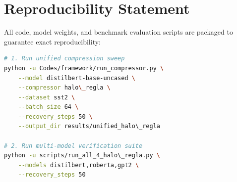 \section{Reproducibility Statement}
All code, model weights, and benchmark evaluation scripts are packaged to guarantee exact reproducibility:
\begin{lstlisting}[language=bash]
# 1. Run unified compression sweep
python -u Codes/framework/run_compressor.py \
    --model distilbert-base-uncased \
    --compressor halo\_regla \
    --dataset sst2 \
    --batch_size 64 \
    --recovery_steps 50 \
    --output_dir results/unified_halo\_regla

# 2. Run multi-model verification suite
python -u scripts/run_all_4_halo\_regla.py \
    --models distilbert,roberta,gpt2 \
    --recovery_steps 50
\end{lstlisting}

